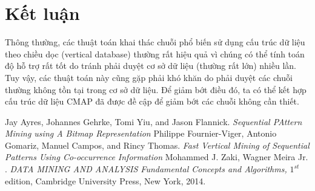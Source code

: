 \documentclass[a4paper 14pt]{article}
\begin{document}
	\section{Kết luận}
		Thông thường, các thuật toán khai thác chuỗi phổ biến sử dụng cấu trúc dữ liệu theo chiều dọc (vertical database) thường rất hiệu quả vì chúng có thể tính toán độ hỗ trợ rất tốt do tránh phải duyệt cơ sở dữ liệu (thường rất lớn) nhiều lần. Tuy vậy, các thuật toán này cũng gặp phải khó khăn do phải duyệt các chuỗi thường không tồn tại trong cơ sở dữ liệu. Để giảm bớt điều đó, ta có thể kết hợp cấu trúc dữ liệu CMAP đã được đề cập để giảm bớt các chuỗi không cần thiết.
	\begin{thebibliography}{9}
		
		Jay Ayres, Johannes Gehrke, Tomi Yiu, and Jason Flannick. \emph{Sequential PAttern Mining using A Bitmap Representation}
		 Philippe Fournier-Viger, Antonio Gomariz, Manuel Campos, and Rincy Thomas. \emph{Fast Vertical Mining of Sequential Patterns Using Co-occurrence Information}
		 Mohammed J. Zaki, Wagner Meira Jr. . \emph{DATA MINING AND ANALYSIS Fundamental Concepts and Algorithms,} $1^{st}$ edition, Cambridge University Press, New York, 2014.
	\end{thebibliography}
\end{document}
